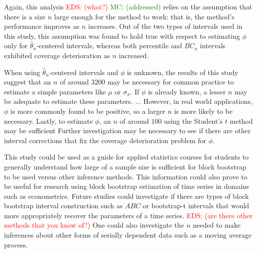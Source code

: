 \documentclass[12pt, letterpaper, titlepage]{article}
\newcommand{\eds}[1]{\textcolor{red}{EDS: (#1)}}
\newcommand{\mc}[1]{\textcolor{green}{MC: (#1)}}
\begin{document}
Again, this analysis \eds{what?} \mc{addressed} relies on the assumption that
there is a size $n$ large enough for the method to work: that is, the method's
performance improves as $n$ increases. Out of the two types of intervals used
in this study, this assumption was found to hold true with respect to
estimating $\phi$ only for $\hat{\theta}_{n}$-centered intervals, whereas both
percentile and $BC_a$ intervals exhibited coverage deterioration as $n$
increased.


When using $\hat{\theta}_{n}$-centered intervals and $\phi$ is
unknown, the results of this study suggest that an $n$ of around $3200$ may be
necessary for common practice to estimate a simple parameters like $\mu$ 
or $\sigma_x$. If $\phi$ is already known, a lesser $n$ may be adequate
to
estimate these parameters. ... However, in real world applications, $\phi$ is
more commonly found to be positive, so a larger $n$ is more likely to be
necessary. Lastly, to estimate $\phi$, an $n$ of around $100$ using the 
Student's $t$ method
 may be sufficient
Further investigation may be necessary to see if there are other interval
corrections that fix the coverage deterioration problem for $\phi$.


This study could be used as a guide for applied statistics courses for students
to generally understand how large of a sample size is sufficient for block
bootstrap to be used versus other inference methods.
This information could also prove to be useful for research using block
bootstrap
estimation of time series in domains such as econometrics. Future studies
could investigate if there are types of block bootstrap interval
construction such as $ABC$ or bootstrap-t intervals
that would more appropriately recover the parameters of a time
series. \eds{are there other methods that you know of?} 
One could also investigate the $n$ needed to make inferences about
other forms of serially dependent data such as a moving average process. 




\end{document}
